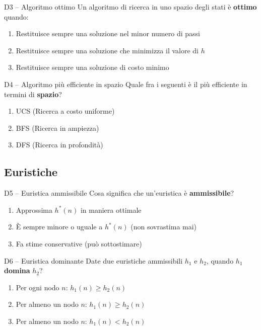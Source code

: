 \documentclass[12pt,a4paper]{article}
\begin{document}
\begin{domanda}{D3 -- Algoritmo ottimo}
Un algoritmo di ricerca in uno spazio degli stati è \textbf{ottimo} quando:
\begin{enumerate}[label=\alph*.]
  \item Restituisce sempre una soluzione nel minor numero di passi
  \item Restituisce sempre una soluzione che minimizza il valore di $h$
  \item Restituisce sempre una soluzione di costo minimo
\end{enumerate}
\end{domanda}

\begin{domanda}{D4 -- Algoritmo più efficiente in spazio}
Quale fra i seguenti è il più efficiente in termini di \textbf{spazio}?
\begin{enumerate}[label=\alph*.]
  \item UCS (Ricerca a costo uniforme)
  \item BFS (Ricerca in ampiezza)
  \item DFS (Ricerca in profondità)
\end{enumerate}
\end{domanda}

\subsection{Euristiche}

\begin{domanda}{D5 -- Euristica ammissibile}
Cosa significa che un'euristica è \textbf{ammissibile}?
\begin{enumerate}[label=\alph*.]
  \item Approssima $h^*(n)$ in maniera ottimale
  \item È sempre minore o uguale a $h^*(n)$ (non sovrastima mai)
  \item Fa stime conservative (può sottostimare)
\end{enumerate}
\end{domanda}

\begin{domanda}{D6 -- Euristica dominante}
Date due euristiche ammissibili $h_1$ e $h_2$, quando $h_1$ \textbf{domina} $h_2$?
\begin{enumerate}[label=\alph*.]
  \item Per ogni nodo $n$: $h_1(n) \geq h_2(n)$
  \item Per almeno un nodo $n$: $h_1(n) \geq h_2(n)$
  \item Per almeno un nodo $n$: $h_1(n) < h_2(n)$
\end{enumerate}
\end{domanda}
\end{document}
